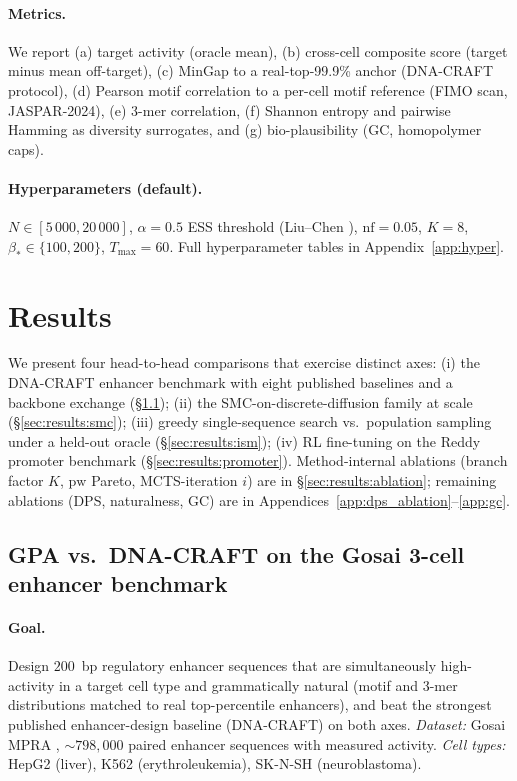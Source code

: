 \documentclass{article}
\theoremstyle{definition}
\theoremstyle{remark}
\newcommand{\dnacraft}{\textsc{DNA-CRAFT}\xspace}
\begin{document}
\paragraph{Metrics.}
We report (a) target activity (oracle mean), (b) cross-cell composite score (target minus mean off-target), (c) MinGap to a real-top-99.9\% anchor (\dnacraft{} protocol), (d) Pearson motif correlation to a per-cell motif reference (FIMO scan, JASPAR-2024), (e) 3-mer correlation, (f) Shannon entropy and pairwise Hamming as diversity surrogates, and (g) bio-plausibility (GC, homopolymer caps).

\paragraph{Hyperparameters (default).}
$N\!\in\![5\!\,000,20\,000]$, $\alpha\!=\!0.5$ ESS threshold (Liu–Chen \citealt{liuchen1995}), $\mathrm{nf}\!=\!0.05$, $K\!=\!8$, $\beta_*\!\in\!\{100,200\}$, $T_{\max}\!=\!60$. Full hyperparameter tables in Appendix~\ref{app:hyper}.

\section{Results}\label{sec:results}

We present four head-to-head comparisons that exercise distinct axes: (i) the \dnacraft{} enhancer benchmark with eight published baselines and a backbone exchange (\S\ref{sec:results:dnacraft}); (ii) the SMC-on-discrete-diffusion family at scale (\S\ref{sec:results:smc}); (iii) greedy single-sequence search vs.\ population sampling under a held-out oracle (\S\ref{sec:results:ism}); (iv) RL fine-tuning on the Reddy promoter benchmark (\S\ref{sec:results:promoter}). Method-internal ablations (branch factor $K$, $\mathrm{pw}$ Pareto, MCTS-iteration $i$) are in \S\ref{sec:results:ablation}; remaining ablations (DPS, naturalness, GC) are in Appendices~\ref{app:dps_ablation}--\ref{app:gc}.

\subsection{GPA vs.\ DNA-CRAFT on the Gosai 3-cell enhancer benchmark}\label{sec:results:dnacraft}

\paragraph{Goal.}
Design $200$~bp regulatory enhancer sequences that are simultaneously high-activity in a target cell type and grammatically natural (motif and 3-mer distributions matched to real top-percentile enhancers), and beat the strongest published enhancer-design baseline (DNA-CRAFT) on both axes. \emph{Dataset:} Gosai MPRA \citep{gosai2024mpra}, $\sim\!798{,}000$ paired enhancer sequences with measured activity. \emph{Cell types:} HepG2 (liver), K562 (erythroleukemia), SK-N-SH (neuroblastoma).
\end{document}
